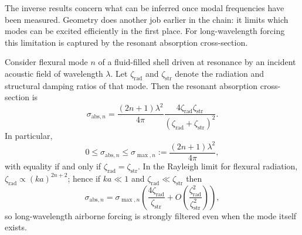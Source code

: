 The inverse results concern what can be inferred once modal frequencies have
been measured.  Geometry does another job earlier in the chain: it limits which
modes can be excited efficiently in the first place.  For long-wavelength
forcing this limitation is captured by the resonant absorption cross-section.

\begin{proposition}
\label{prop:p10_breit_wigner}
Consider flexural mode $n$ of a fluid-filled shell driven at resonance by an
incident acoustic field of wavelength $\lambda$.  Let $\zeta_\mathrm{rad}$ and
$\zeta_\mathrm{str}$ denote the radiation and structural damping ratios of that
mode.  Then the resonant absorption cross-section is
\begin{equation}
  \sigma_{\mathrm{abs},n}
  =
  \frac{(2n+1)\lambda^2}{4\pi}
  \frac{4\zeta_\mathrm{rad}\zeta_\mathrm{str}}
  {(\zeta_\mathrm{rad}+\zeta_\mathrm{str})^2}.
  \label{eq:p10_breit_wigner}
\end{equation}
In particular,
\begin{equation}
  0 \leq \sigma_{\mathrm{abs},n}
  \leq
  \sigma_{\max,n}
  :=
  \frac{(2n+1)\lambda^2}{4\pi},
  \label{eq:p10_sigma_max}
\end{equation}
with equality if and only if $\zeta_\mathrm{rad}=\zeta_\mathrm{str}$.  In the
Rayleigh limit for flexural radiation, $\zeta_\mathrm{rad}\propto(ka)^{2n+2}$;
hence if $ka\ll 1$ and $\zeta_\mathrm{rad}\ll\zeta_\mathrm{str}$ then
\begin{equation}
  \sigma_{\mathrm{abs},n}
  =
  \sigma_{\max,n}
  \left(
    \frac{4\zeta_\mathrm{rad}}{\zeta_\mathrm{str}}
    + O\!\left(\frac{\zeta_\mathrm{rad}^2}{\zeta_\mathrm{str}^2}\right)
  \right),
  \label{eq:p10_sigma_abs_low_ka}
\end{equation}
so long-wavelength airborne forcing is strongly filtered even when the mode
itself exists.
\end{proposition}


